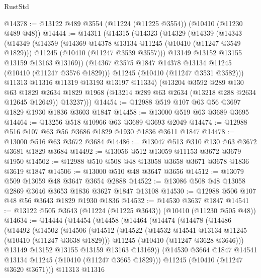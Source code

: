\begin{lexlean}{RustStd}
\begin{coremodule}
@14378 := @13122 @489 @3554 (@11224 (@11225 @3554)) (@10410 (@11230 @489 @48))
@14444 := @14311
    (@14315
      (@14323
        (@14329
          (@14339
            (@14343
              (@14349
                (@14359
                  (@14369 @14378 @13134 @11245 (@10410 (@11247 @3549 @1829)))
                  @11245
                  (@10410 (@11247 @3539 @3557)))
                @13149
                @13152
                @13155
                @13159
                @13163
                @13169))
            (@14367 @3575 @1847 @14378 @13134 @11245 (@10410 (@11247 @3576 @1829)))
            @11245
            (@10410 (@11247 @3531 @3582)))
          @11313
          @11316
          @11319
          @13193
          @13197
          @11334)
        (@13204
          @3592
          @289
          @130
          @63
          @1829
          @2634
          @1829
          @1968
          (@13214 @289 @63 @2634 (@13218 @288 @2634 @12645 @12649))
          @13237)))
@14454 := @12988 @519 @107 @63 @56 @3697 @1829 @1930 @1836 @3603 @1847
@14458 := @13000 @519 @63 @3689 @3695
@14464 := @13256 @518 @10966 @63 @3689 @3693 @2049
@14474 := @12988 @516 @107 @63 @56 @3686 @1829 @1930 @1836 @3611 @1847
@14478 := @13000 @516 @63 @3672 @3684
@14486 := @13047 @513 @310 @130 @63 @3672 @3681 @1829 @3684
@14492 := @13056 @512 @13059 @11153 @3672 @3679 @1950
@14502 := @12988 @510 @508 @48 @13058 @3658 @3671 @3678 @1836 @3619 @1847
@14506 := @13000 @510 @48 @3647 @3656
@14512 := @13079 @509 @13059 @48 @3647 @3654 @2888
@14522 := @13086 @508 @48 @13058 @2869 @3646 @3653 @1836 @3627 @1847 @13108
@14530 := @12988 @506 @107 @48 @56 @3643 @1829 @1930 @1836
@14532 := @14530 @3637 @1847
@14541 := @13122 @505 @3643 (@11224 (@11225 @3643)) (@10410 (@11230 @505 @48))
@14634 := @14444
    (@14454
      (@14458
        (@14464
          (@14474
            (@14478
              (@14486
                (@14492
                  (@14502
                    (@14506
                      (@14512
                        (@14522
                          (@14532 @14541 @13134 @11245 (@10410 (@11247 @3638 @1829)))
                          @11245
                          (@10410 (@11247 @3628 @3646)))
                        @13149
                        @13152
                        @13155
                        @13159
                        @13163
                        @13169))
                    (@14530 @3664 @1847 @14541 @13134 @11245 (@10410 (@11247 @3665 @1829)))
                    @11245
                    (@10410 (@11247 @3620 @3671)))
                  @11313
                  @11316

\end{coremodule}
\end{lexlean}
